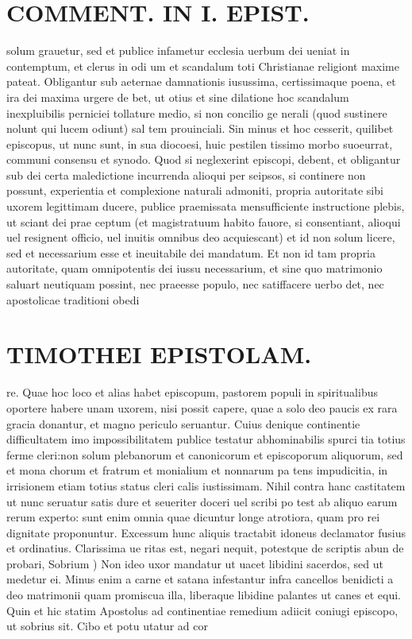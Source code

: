\documentclass{article}
\begin{document}
\begin{pages}
\section*{COMMENT. IN I. EPIST. }
\marginpar{[ p.72 ]}\pstart solum grauetur, sed et publice infametur ecclesia uerbum dei ueniat in contemptum, et clerus in odi um et scandalum toti Christianae religiont maxime pateat. Obligantur sub aeternae damnationis iusussima, certissimaque poena, et ira dei maxima urgere de bet, ut otius et sine dilatione hoc scandalum inexpluibilis perniciei tollature medio, si non concilio ge nerali (quod sustinere nolunt qui lucem odiunt) sal tem prouinciali. Sin minus et hoc cesserit, quilibet episcopus, ut nunc sunt, in sua diocoesi, huic pestilen tissimo morbo suoeurrat, communi consensu et synodo. Quod si neglexerint episcopi, debent, et obligantur sub dei certa maledictione incurrenda alioqui per seipsos, si continere non possunt, experientia et complexione naturali admoniti, propria autoritate sibi uxorem legittimam ducere, publice praemissata mensufficiente instructione plebis, ut sciant dei prae ceptum (et magistratuum habito fauore, si consentiant, alioqui uel resignent officio, uel inuitis omnibus deo acquiescant) et id non solum licere, sed et necessarium esse et ineuitabile dei mandatum. Et non id tam propria autoritate, quam omnipotentis dei iussu necessarium, et sine quo matrimonio saluart neutiquam possint, nec praeesse populo, nec satiffacere uerbo det, nec apostolicae traditioni obedi  \pend
\section*{TIMOTHEI EPISTOLAM. }
\marginpar{[ p.73 ]}\pstart re. Quae hoc loco et alias habet episcopum, pastorem populi in spiritualibus oportere habere unam uxorem, nisi possit capere, quae a solo deo paucis ex rara gracia donantur, et magno periculo seruantur. Cuius denique continentie difficultatem imo impossibilitatem publice testatur abhominabilis spurci tia totius ferme cleri:non solum plebanorum et canonicorum et episcoporum aliquorum, sed et mona chorum et fratrum et monialium et nonnarum pa tens impudicitia, in irrisionem etiam totius status cleri calis iustissimam. Nihil contra hanc castitatem ut nunc seruatur satis dure et seueriter doceri uel scribi po test ab aliquo earum rerum experto: sunt enim omnia quae dicuntur longe atrotiora, quam pro rei dignitate proponuntur. Excessum hunc aliquis tractabit idoneus declamator fusius et ordinatius. Clarissima ue ritas est, negari nequit, potestque de scriptis abun de probari,  \pend\pstart Sobrium ) Non ideo uxor mandatur ut uacet libidini sacerdos, sed ut medetur ei. Minus enim a carne et satana infestantur infra cancellos benidicti a deo matrimonii quam promiscua illa, liberaque libidine palantes ut canes et equi. Quin et hic statim Apostolus ad continentiae remedium adiicit coniugi episcopo, ut sobrius sit. Cibo et potu utatur ad cor\pend

\end{pages}
\end{document}
